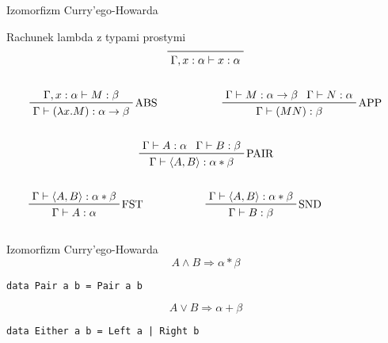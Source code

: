 \documentclass{beamer}
\newcommand{\imp}{\rightarrow}
\begin{document}
\begin{frame}{Izomorfizm Curry'ego-Howarda}
  \begin{block}{Rachunek lambda z typami prostymi}
    $$ \prfaxiom{\Gamma, x:\alpha \vdash x:\alpha} $$

    \pause

    \begin{columns}
      \begin{column}{0.5\textwidth}
        $$ \prftree[r]{ABS}
          {\Gamma, x:\alpha \vdash M:\beta}
          {\Gamma \vdash (\lambda x.M): \alpha \imp \beta}
        $$
      \end{column}

      \begin{column}{0.5\textwidth}
        $$ \prftree[r]{APP}
          {\Gamma \vdash M:\alpha \imp \beta}
          {\Gamma \vdash N:\alpha}
          {\Gamma \vdash (M N): \beta}
        $$
      \end{column}
    \end{columns}

    \pause

    $$ \prftree[r]{PAIR}
      {\Gamma \vdash A:\alpha}
      {\Gamma \vdash B:\beta}
      {\Gamma \vdash \langle A, B \rangle: \alpha * \beta}
    $$

    \begin{columns}
      \begin{column}{0.5\textwidth}
        $$ \prftree[r]{FST}
          {\Gamma \vdash \langle A, B \rangle: \alpha * \beta}
          {\Gamma \vdash A:\alpha}
        $$
      \end{column}

      \begin{column}{0.5\textwidth}
        $$ \prftree[r]{SND}
          {\Gamma \vdash \langle A, B \rangle: \alpha * \beta}
          {\Gamma \vdash B:\beta}
        $$
      \end{column}

      \begin{column}{0.5\textwidth}

      \end{column}
    \end{columns}
  \end{block}
\end{frame}

\begin{frame}{Izomorfizm Curry'ego-Howarda}
  $$ A \land B \Rightarrow \alpha * \beta $$
  
  \begin{center}
    \texttt{data Pair a b = Pair a b}
  \end{center}

  $$ A \lor B \Rightarrow \alpha + \beta $$ 

  \begin{center}
    \texttt{data Either a b = Left a | Right b}
  \end{center}


\end{frame}
\end{document}
